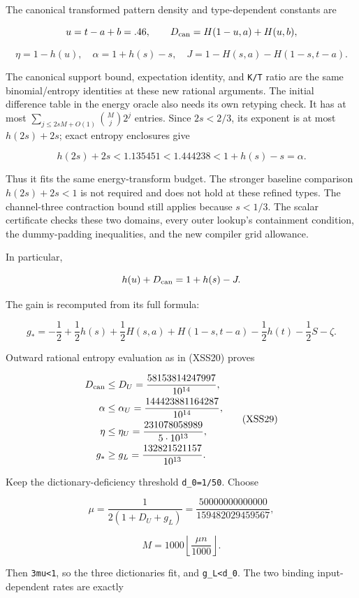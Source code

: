 The canonical transformed pattern density and type-dependent constants are

\[
u=t-a+b=.46,\qquad
 D_{\rm can}=H(1-u,a)+H(u,b),
\]

\[
\eta=1-h(u),\quad \alpha=1+h(s)-s,\quad
 J=1-H(s,a)-H(1-s,t-a).
 \tag{XSS27}
\]

The canonical support bound, expectation identity, and \texttt{K/T} ratio are the same binomial/entropy identities at these new rational arguments. The initial difference table in the energy oracle also needs its own retyping check. It has at most \(\sum_{j\le 2sM+O(1)}\binom Mj2^j\) entries. Since \(2s<2/3\), its exponent is at most \(h(2s)+2s\); exact entropy enclosures give

\[
h(2s)+2s<1.135451<1.444238<1+h(s)-s=\alpha.
\]

Thus it fits the same energy-transform budget. The stronger baseline comparison \(h(2s)+2s<1\) is not required and does not hold at these refined types. The channel-three contraction bound still applies because \(s<1/3\). The scalar certificate checks these two domains, every outer lookup's containment condition, the dummy-padding inequalities, and the new compiler grid allowance.

In particular,

\[
h(u)+D_{\rm can}=1+h(s)-J.
\]

The gain is recomputed from its full formula:

\[
g_*=-\frac12+\frac12h(s)+\frac12H(s,a)+H(1-s,t-a)
       -\frac12h(t)-\frac12S-\zeta.
 \tag{XSS28}
\]

Outward rational entropy evaluation as in (XSS20) proves

\[
\begin{aligned}
 D_{\rm can}&\le D_U=\frac{58153814247997}{10^{14}},\\
 \alpha&\le\alpha_U=\frac{144423881164287}{10^{14}},\\
 \eta&\le\eta_U=\frac{231078058989}{5\cdot10^{13}},\\
 g_*&\ge g_L=\frac{132821521157}{10^{13}}.
 \end{aligned}
 \tag{XSS29}
\]

Keep the dictionary-deficiency threshold \texttt{d\_0=1/50}. Choose

\[
\mu=\frac1{2(1+D_U+g_L)}
 =\frac{50000000000000}{159482029459567},
\]

\[
M=1000\left\lfloor\frac{\mu n}{1000}\right\rfloor.
 \tag{XSS30}
\]

Then \texttt{3mu\textless{}1}, so the three dictionaries fit, and \texttt{g\_L\textless{}d\_0}. The two binding input-dependent rates are exactly

